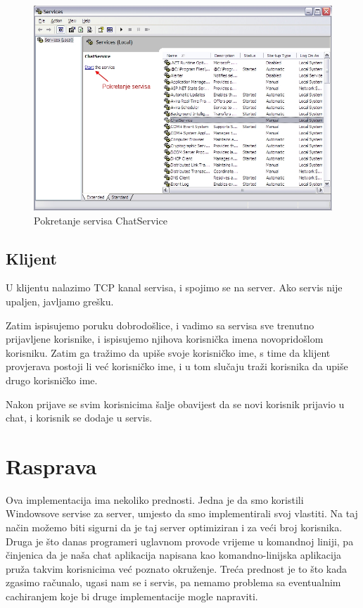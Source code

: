 \documentclass[10pt,a4paper,onecolumn,titlepage]{article}
\begin{document}
\begin{figure}[!ht]
\begin{minipage}{\textwidth}
\centering
\includegraphics[width=\textwidth]{images/start_service.jpg}
\caption{Pokretanje servisa ChatService}
\end{minipage}
\end{figure}

\subsection{Klijent}

U klijentu nalazimo TCP kanal servisa, i spojimo se na server. Ako servis
nije upaljen, javljamo grešku.

Zatim ispisujemo poruku dobrodošlice, i vadimo sa servisa sve trenutno prijavljene
korisnike, i ispisujemo njihova korisnička imena novopridošlom korisniku. Zatim
ga tražimo da upiše svoje korisničko ime, s time da klijent provjerava postoji li
već korisničko ime, i u tom slučaju traži korisnika da upiše drugo korisničko ime.

Nakon prijave se svim korisnicima šalje obavijest da se novi korisnik prijavio
u chat, i korisnik se dodaje u servis.

\section{Rasprava}

Ova implementacija ima nekoliko prednosti. Jedna je da smo koristili Windowsove
servise za server, umjesto da smo implementirali svoj vlastiti. Na taj način
možemo biti sigurni da je taj server optimiziran i za veći broj korisnika.
Druga je što danas programeri uglavnom provode vrijeme u komandnoj liniji,
pa činjenica da je naša chat aplikacija napisana kao komandno-linijska aplikacija
pruža takvim korisnicima već poznato okruženje. Treća prednost je to što kada
zgasimo računalo, ugasi nam se i servis, pa nemamo problema sa eventualnim
cachiranjem koje bi druge implementacije mogle napraviti.
\end{document}
